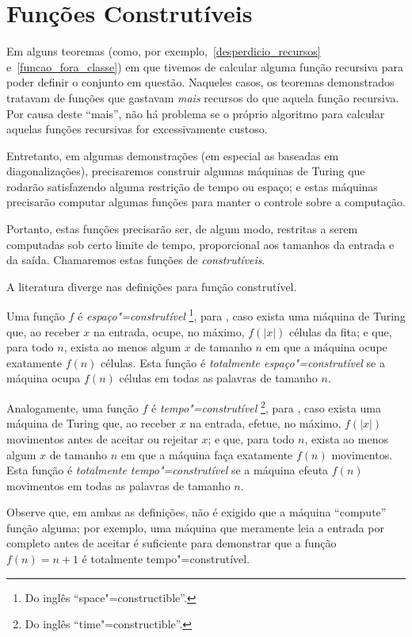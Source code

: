 \section{Funções Construtíveis}

Em alguns teoremas
(como, por exemplo,~\ref{desperdicio_recursos} e~\ref{funcao_fora_classe})
em que tivemos de calcular alguma função recursiva
para poder definir o conjunto em questão.
Naqueles casos,
os teoremas demonstrados tratavam de funções
que gastavam \emph{mais} recursos do que aquela função recursiva.
Por causa deste ``mais'',
não há problema
se o próprio algoritmo para calcular aquelas funções recursivas
for excessivamente custoso.

Entretanto,
em algumas demonstrações
(em especial as baseadas em diagonalizações),
precisaremos construir algumas máquinas de Turing
que rodarão satisfazendo alguma restrição de tempo ou espaço;
e estas máquinas precisarão computar algumas funções
para manter o controle sobre a computação.

Portanto,
estas funções precisarão ser,
de algum modo,
restritas a serem computadas sob certo limite de tempo,
proporcional aos tamanhos da entrada e da saída.
Chamaremos estas funções de \emph{construtíveis}.

A literatura diverge nas definições para função construtível.

Uma função $f$ é \emph{espaço"=construtível}
\footnote{
    Do inglês ``space"=constructible''.
}, para
,
caso exista uma máquina de Turing que,
ao receber $x$ na entrada,
ocupe, no máximo, $f(|x|)$ células da fita;
e que, para todo $n$, exista ao menos algum $x$ de tamanho $n$
em que a máquina ocupe exatamente $f(n)$ células.
Esta função é \emph{totalmente espaço"=construtível}
se a máquina ocupa $f(n)$ células em todas as palavras de tamanho $n$.

Analogamente, uma função $f$ é \emph{tempo"=construtível}
\footnote{
    Do inglês ``time"=constructible''.
}, para
,
caso exista uma máquina de Turing que,
ao receber $x$ na entrada,
efetue, no máximo, $f(|x|)$ movimentos antes de aceitar ou rejeitar $x$;
e que, para todo $n$, exista ao menos algum $x$ de tamanho $n$
em que a máquina faça exatamente $f(n)$ movimentos.
Esta função é \emph{totalmente tempo"=construtível}
se a máquina efeuta $f(n)$ movimentos em todas as palavras de tamanho $n$.

Observe que,
em ambas as definições,
não é exigido que a máquina ``compute'' função alguma;
por exemplo,
uma máquina que meramente leia a entrada por completo antes de aceitar
é suficiente para demonstrar que a função $f(n) = n+1$
é totalmente tempo"=construtível.

